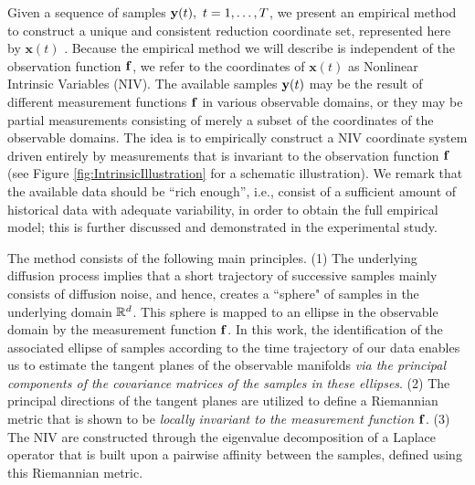 Given a sequence of samples $\data(t), \ t=1,\ldots,T$, we present an empirical method to construct a unique and consistent reduction coordinate set, represented here by $\mathbf{x}(t)$ \cite{singer2008non}.
%
Because the empirical method we will describe is independent of the observation function $\mathbf{f}$,
we refer to the coordinates of $\mathbf{x}(t)$ as Nonlinear Intrinsic Variables (NIV).
%
The available samples $\mathbf{y}(t)$ may be the result of different measurement functions $\mathbf{f}$ in various observable domains,
or they may be partial measurements consisting of merely a subset of the coordinates of the observable domains.
%
The idea is to empirically construct a NIV coordinate system driven entirely by measurements that is invariant to the observation function $\mathbf{f}$
(see Figure \ref{fig:IntrinsicIllustration} for a schematic illustration).
%
We remark that the available data should be ``rich enough'', i.e., consist of a sufficient amount of historical data with adequate variability, in order to obtain the full empirical model;
this is further discussed and demonstrated in the experimental study.

The method consists of the following main principles.
%
(1) The underlying diffusion process implies that a short trajectory of successive samples mainly consists of diffusion noise,
and hence, creates a ``sphere" of samples in the underlying domain $\mathbb{R}^d$.
%
This sphere is mapped to an ellipse in the observable domain by the measurement function $\mathbf{f}$.
%
In this work, the identification of the associated ellipse of samples according to the time trajectory of our data enables us
to estimate the tangent planes of the observable manifolds {\em via the principal components of the covariance matrices of the samples in these ellipses}.
%
(2) The principal directions of the tangent planes are utilized to define a Riemannian metric that is shown to be {\em locally invariant to the measurement function $\mathbf{f}$}.
%
(3) The NIV are constructed through the eigenvalue decomposition of a Laplace operator that is built upon a pairwise affinity between the samples, defined using this Riemannian metric.

